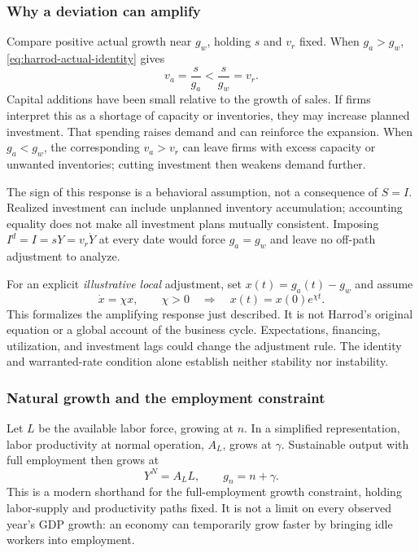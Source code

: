 \subsubsection{Why a deviation can amplify}

Compare positive actual growth near $g_w$, holding $s$ and $v_r$ fixed. When
$g_a>g_w$, \eqref{eq:harrod-actual-identity} gives
\begin{equation}
v_a=\frac{s}{g_a}<\frac{s}{g_w}=v_r.
\end{equation}
Capital additions have been small relative to the growth of sales. If firms
interpret this as a shortage of capacity or inventories, they may increase
planned investment. That spending raises demand and can reinforce the expansion.
When $g_a<g_w$, the corresponding $v_a>v_r$ can leave firms with excess capacity
or unwanted inventories; cutting investment then weakens demand further.

The sign of this response is a behavioral assumption, not a consequence of
$S=I$. Realized investment can include unplanned inventory accumulation;
accounting equality does not make all investment plans mutually consistent.
Imposing $I^d=I=sY=v_r\dot Y$ at every date would force $g_a=g_w$ and leave
no off-path adjustment to analyze.

For an explicit \emph{illustrative local} adjustment, set
$x(t)=g_a(t)-g_w$ and assume
\begin{equation}\label{eq:harrod-local-instability}
\dot x=\chi x,\qquad \chi>0
\quad\Longrightarrow\quad x(t)=x(0)e^{\chi t}.
\end{equation}
This formalizes the amplifying response just described. It is not Harrod's
original equation or a global account of the business cycle. Expectations,
financing, utilization, and investment lags could change the adjustment rule.
The identity and warranted-rate condition alone establish neither stability
nor instability.

\subsubsection{Natural growth and the employment constraint}

Let $L$ be the available labor force, growing at $n$. In a simplified
representation, labor productivity at normal operation, $A_L$, grows at
$\gamma$. Sustainable output with full employment then grows at
\begin{equation}\label{eq:harrod-natural}
Y^N=A_LL,\qquad g_n=n+\gamma.
\end{equation}
This is a modern shorthand for the full-employment growth constraint, holding
labor-supply and productivity paths fixed. It is not a limit on every observed
year's GDP growth: an economy can temporarily grow faster by bringing idle
workers into employment.

